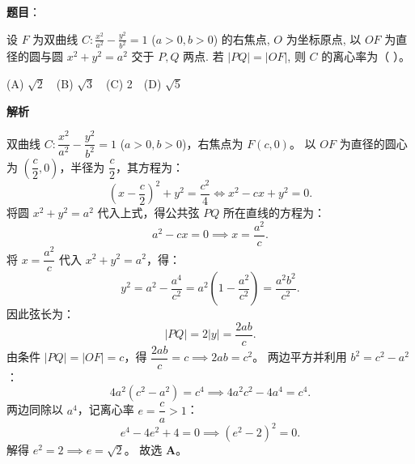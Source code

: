 \begin{answer}

\textbf{题目}：

设 $F$ 为双曲线 $C: \frac{x^2}{a^2} - \frac{y^2}{b^2} = 1$ ($a > 0, b > 0$) 的右焦点, $O$ 为坐标原点, 以 $OF$ 为直径的圆与圆 $x^2 + y^2 = a^2$ 交于 $P, Q$ 两点. 若 $|PQ| = |OF|$, 则 $C$ 的离心率为（ ）。

(A) $\sqrt{2}$　(B) $\sqrt{3}$　(C) 2　(D) $\sqrt{5}$

\textbf{解析}

双曲线 $C: \dfrac{x^2}{a^2} - \dfrac{y^2}{b^2} = 1$ ($a > 0, b > 0$)，右焦点为 $F(c, 0)$。
以 $OF$ 为直径的圆心为 $\left(\dfrac{c}{2}, 0\right)$，半径为 $\dfrac{c}{2}$，其方程为：
\nopagebreak[4]
\[\left(x - \frac{c}{2}\right)^2 + y^2 = \frac{c^2}{4} \iff x^2 - cx + y^2 = 0.\]
将圆 $x^2 + y^2 = a^2$ 代入上式，得公共弦 $PQ$ 所在直线的方程为：
\nopagebreak[4]
\[a^2 - cx = 0 \implies x = \frac{a^2}{c}.\]
将 $x = \dfrac{a^2}{c}$ 代入 $x^2 + y^2 = a^2$，得：
\nopagebreak[4]
\[y^2 = a^2 - \frac{a^4}{c^2} = a^2 \left(1 - \frac{a^2}{c^2}\right) = \frac{a^2 b^2}{c^2}.\]
因此弦长为：
\nopagebreak[4]
\[|PQ| = 2|y| = \frac{2ab}{c}.\]
由条件 $|PQ| = |OF| = c$，得 $\dfrac{2ab}{c} = c \implies 2ab = c^2$。
两边平方并利用 $b^2 = c^2 - a^2$：
\nopagebreak[4]
\[4a^2(c^2 - a^2) = c^4 \implies 4a^2 c^2 - 4a^4 = c^4.\]
两边同除以 $a^4$，记离心率 $e = \dfrac{c}{a} > 1$：
\nopagebreak[4]
\[e^4 - 4e^2 + 4 = 0 \implies (e^2 - 2)^2 = 0.\]
解得 $e^2 = 2 \implies e = \sqrt{2}$。
故选 \textbf{A}。


\end{answer}
